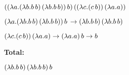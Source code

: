 \documentclass[12pt]{article}
\begin{document}
	$\\*((\lambda a.(\lambda b.b\,b)\,(\lambda b.b\,b))\,b)\,((\lambda c.(c\,b))\,(\lambda a.a))$
	
	$\\*(\lambda a.(\lambda b.b\,b)\,(\lambda b.b\,b))\,b\, \to
	\\*(\lambda b.b\,b)\,(\lambda b.b\,b)$
	
	$\\*(\lambda c.(c\,b))\,(\lambda a.a) \to
	\\*(\lambda a.a)\,b \to
	\\*b$
	
	\begin{flushleft}
		\textbf{Total:}
	\end{flushleft}
	
	$\\*(\lambda b.b\,b)\,(\lambda b.b\,b)\,b$
	
	
\end{document}
